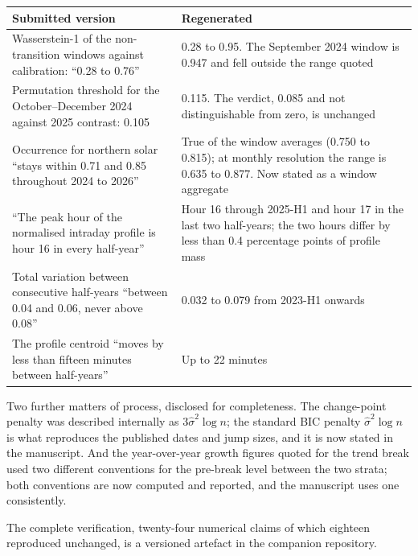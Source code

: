 \documentclass[11pt,a4paper]{article}
\begin{document}
\begin{center}
\footnotesize
\begin{tabular}{@{}p{}p{}@{}}
\toprule
Submitted version & Regenerated \\
\midrule
Wasserstein-1 of the non-transition windows against calibration: ``0.28 to 0.76'' & 0.28 to 0.95. The September 2024 window is 0.947 and fell outside the range quoted \\
Permutation threshold for the October--December 2024 against 2025 contrast: 0.105 & 0.115. The verdict, 0.085 and not distinguishable from zero, is unchanged \\
Occurrence for northern solar ``stays within 0.71 and 0.85 throughout 2024 to 2026'' & True of the window averages (0.750 to 0.815); at monthly resolution the range is 0.635 to 0.877. Now stated as a window aggregate \\
``The peak hour of the normalised intraday profile is hour 16 in every half-year'' & Hour 16 through 2025-H1 and hour 17 in the last two half-years; the two hours differ by less than 0.4 percentage points of profile mass \\
Total variation between consecutive half-years ``between 0.04 and 0.06, never above 0.08'' & 0.032 to 0.079 from 2023-H1 onwards \\
The profile centroid ``moves by less than fifteen minutes between half-years'' & Up to 22 minutes \\
\bottomrule
\end{tabular}
\end{center}

Two further matters of process, disclosed for completeness. The change-point penalty was described internally as $3\hat\sigma^2\log n$; the standard BIC penalty $\hat\sigma^2\log n$ is what reproduces the published dates and jump sizes, and it is now stated in the manuscript. And the year-over-year growth figures quoted for the trend break used two different conventions for the pre-break level between the two strata; both conventions are now computed and reported, and the manuscript uses one consistently.

The complete verification, twenty-four numerical claims of which eighteen reproduced unchanged, is a versioned artefact in the companion repository.
\end{document}
